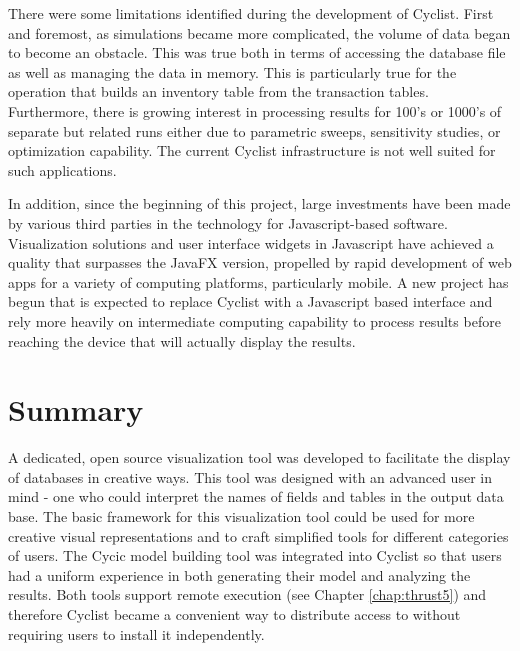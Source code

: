 There were some limitations identified during the development of Cyclist.
First and foremost, as \Cyclus simulations became more complicated, the volume
of data began to become an obstacle.  This was true both in terms of accessing
the database file as well as managing the data in memory.  This is
particularly true for the operation that builds an inventory table from the
transaction tables.  Furthermore, there is growing interest in processing
results for 100's or 1000's of separate but related \Cyclus runs either due to
parametric sweeps, sensitivity studies, or optimization capability.  The
current Cyclist infrastructure is not well suited for such applications.

In addition, since the beginning of this project, large investments have been
made by various third parties in the technology for Javascript-based software.
Visualization solutions and user interface widgets in Javascript have achieved
a quality that surpasses the JavaFX version, propelled by rapid development of
web apps for a variety of computing platforms, particularly mobile.  A new
project has begun that is expected to replace Cyclist with a Javascript based
interface and rely more heavily on intermediate computing capability to
process results before reaching the device that will actually display the
results.

\section{Summary}

A dedicated, open source visualization tool was developed to facilitate the
display of \Cyclus databases in creative ways.  This tool was designed with an
advanced user in mind - one who could interpret the names of fields and tables
in the output data base.  The basic framework for this visualization tool
could be used for more creative visual representations and to craft simplified
tools for different categories of users.  The Cycic model building tool was
integrated into Cyclist so that users had a uniform experience in both
generating their model and analyzing the results.  Both tools support remote
execution (see Chapter \ref{chap:thrust5}) and therefore Cyclist became a
convenient way to distribute access to \Cyclus without requiring users to
install it independently.

